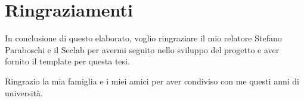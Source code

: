 \chapter*{Ringraziamenti}
In conclusione di questo elaborato, voglio ringraziare il mio relatore Stefano Paraboschi e il Seclab per avermi seguito nello sviluppo del progetto e aver fornito il template per questa tesi.

Ringrazio la mia famiglia e i miei amici per aver condiviso con me questi anni di università.